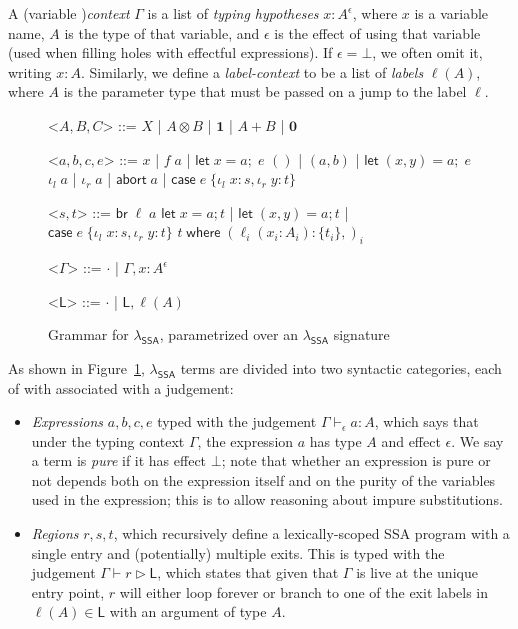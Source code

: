 \documentclass[acmsmall,screen,review]{acmart}
\newcommand{\ms}[1]{\ensuremath{\mathsf{#1}}}
\newcommand{\lto}{:}
\newcommand{\linl}[1]{\iota_l\;{#1}}
\newcommand{\linr}[1]{\iota_r\;{#1}}
\newcommand{\labort}[1]{\ms{abort}\;{#1}}
\newcommand{\letexpr}[3]{\ensuremath{\ms{let}\;#1 = #2;\;#3}}
\newcommand{\caseexpr}[5]{\ms{case}\;#1\;\{\linl{#2} \lto #3, \linr{#4} \lto #5\}}
\newcommand{\letstmt}[3]{\ensuremath{\ms{let}\;#1 = #2; #3}}
\newcommand{\brb}[2]{\ms{br}\;#1\;#2}
\newcommand{\casestmt}[5]{\ms{case}\;#1\;\{\linl{#2} \lto #3, \linr{#4} \lto #5\}}
\newcommand{\where}[2]{#1\;\ms{where}\;#2}
\newcommand{\wbranch}[3]{#1(#2) \lto \{#3\}}
\newcommand{\thyp}[3]{#1 : {#2}^{#3}}
\newcommand{\bhyp}[2]{#1 : #2}
\newcommand{\lhyp}[2]{#1(#2)}
\newcommand{\hasty}[4]{#1 \vdash_{#2} #3: {#4}}
\newcommand{\haslb}[3]{#1 \vdash #2 \rhd #3}
\newcommand{\isotopessa}{\(\lambda_{\ms{SSA}}\)}
\begin{document}
A (variable )\textit{context} $\Gamma$ is a list of \textit{typing hypotheses}
$\thyp{x}{A}{\epsilon}$, where $x$ is a variable name, $A$ is the type of that
variable, and $\epsilon$ is the effect of using that variable (used when filling
holes with effectful expressions). If $\epsilon = \bot$, we often omit it,
writing $\bhyp{x}{A}$. Similarly, we define a \textit{label-context} to be a
list of \textit{labels} $\lhyp{\ell}{A}$, where $A$ is the parameter type that
must be passed on a jump to the label $\ell$.

\begin{figure}[H]
  \begin{center}
    \begin{grammar}
      <\(A, B, C\)> ::= 
      \(X\)
      \;|\; \(A \otimes B\)
      \;|\; \(\mathbf{1}\)
      \;|\; \(A + B\)
      \;|\; \(\mathbf{0}\)

      <\(a, b, c, e\)> ::= \(x\) 
      \;|\;  \(f\;a\)
      \;|\; \(\letexpr{x}{a}{e}\)
      \alt  \(()\)
      \;|\; \((a, b)\)
      \;|\; \(\letexpr{(x, y)}{a}{e}\)
      \alt  \(\linl{a}\) 
      \;|\; \(\linr{a}\)
      \;|\; \(\labort{a}\)
      \;|\; \(\caseexpr{e}{x}{s}{y}{t}\)
      
      <\(s, t\)> ::= \(\brb{\ell}{a}\) 
      \alt  \(\letstmt{x}{a}{t}\)
      \;|\; \(\letstmt{(x, y)}{a}{t}\)
      \;|\; \(\casestmt{e}{x}{s}{y}{t}\)
      \alt  \(\where{t}{(\wbranch{\ell_i}{x_i: A_i}{t_i},)_i}\)

      <\(\Gamma\)> ::= \(\cdot\) \;|\; \(\Gamma, \thyp{x}{A}{\epsilon}\)

      <\(\ms{L}\)> ::= \(\cdot\) \;|\; \(\ms{L}, \lhyp{\ell}{A}\)
    \end{grammar}
  \end{center}
  \caption{Grammar for \isotopessa{}, parametrized over an \isotopessa{} signature}
  \Description{}
  \label{fig:ssa-grammar}
\end{figure}

As shown in Figure~\ref{fig:ssa-grammar}, \isotopessa{} terms are divided into two syntactic
categories, each of with associated with a judgement:
\begin{itemize}
  \item \emph{Expressions} $a, b, c, e$ typed with the judgement $\hasty{\Gamma}{\epsilon}{a}{A}$,
  which says that under the typing context $\Gamma$, the expression $a$ has type $A$ and effect
  $\epsilon$. We say a term is \emph{pure} if it has effect $\bot$; note that whether an expression
  is pure or not depends both on the expression itself and on the purity of the variables used in
  the expression; this is to allow reasoning about impure substitutions.
  \item \emph{Regions} $r, s, t$, which recursively define a lexically-scoped SSA program with a
  single entry and (potentially) multiple exits. This is typed with the judgement
  $\haslb{\Gamma}{r}{\ms{L}}$, which states that given that $\Gamma$ is live at the unique entry
  point, $r$ will either loop forever or branch to one of the exit labels in $\ell(A) \in \ms{L}$
  with an argument of type $A$.
\end{itemize}
\end{document}
